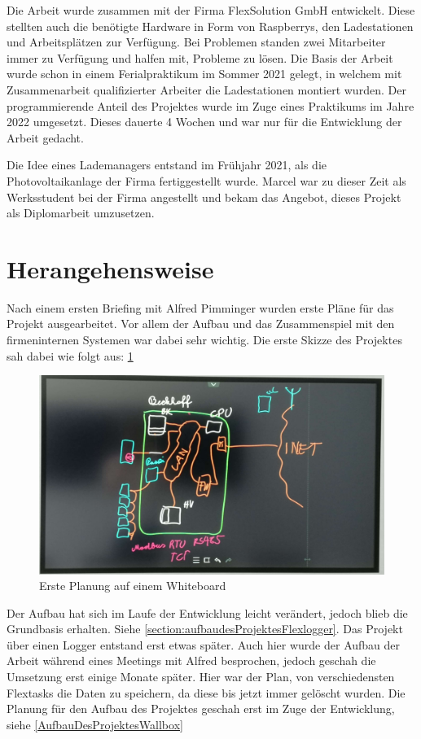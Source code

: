 Die Arbeit wurde zusammen mit der Firma FlexSolution GmbH entwickelt. Diese stellten auch die benötigte Hardware in Form von Raspberrys, den Ladestationen und Arbeitsplätzen zur Verfügung. Bei Problemen standen zwei Mitarbeiter immer zu Verfügung und halfen mit, Probleme zu lösen. Die Basis der Arbeit wurde schon in einem Ferialpraktikum im Sommer 2021 gelegt, in welchem mit Zusammenarbeit qualifizierter Arbeiter die Ladestationen montiert wurden. Der programmierende Anteil des Projektes wurde im Zuge eines Praktikums im Jahre 2022 umgesetzt. Dieses dauerte 4 Wochen und war nur für die Entwicklung der Arbeit gedacht.

Die Idee eines Lademanagers entstand im Frühjahr 2021, als die Photovoltaikanlage der Firma fertiggestellt wurde. Marcel war zu dieser Zeit als Werksstudent bei der Firma angestellt und bekam das Angebot, dieses Projekt als Diplomarbeit umzusetzen.

\section{Herangehensweise}

Nach einem ersten Briefing mit Alfred Pimminger wurden erste Pläne für das Projekt ausgearbeitet. Vor allem der Aufbau und das Zusammenspiel mit den firmeninternen Systemen war dabei sehr wichtig. Die erste Skizze des Projektes sah dabei wie folgt aus: 
\ref{fig:impl:ersteSkizze}

\begin{figure}[h t]
  \centering
  \includegraphics[scale=0.1]{pics/ersteSkizze.jpg}
  \caption{Erste Planung auf einem Whiteboard}
  \label{fig:impl:ersteSkizze}
\end{figure}
 

Der Aufbau hat sich im Laufe der Entwicklung leicht verändert, jedoch blieb die Grundbasis erhalten. Siehe \ref{section:aufbaudesProjektesFlexlogger}. Das Projekt über einen Logger entstand erst etwas später. Auch hier wurde der Aufbau der Arbeit während eines Meetings mit Alfred besprochen, jedoch geschah die Umsetzung erst einige Monate später. Hier war der Plan, von verschiedensten Flextasks die Daten zu speichern, da diese bis jetzt immer gelöscht wurden. Die Planung für den Aufbau des Projektes geschah erst im Zuge der Entwicklung, siehe \ref{AufbauDesProjektesWallbox} 
 
